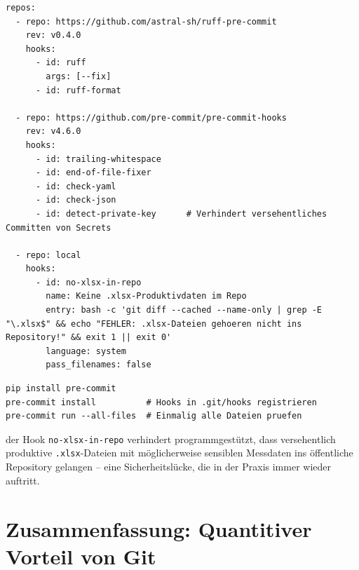 \documentclass[12pt,a4paper]{report}
\theoremstyle{definition}
\theoremstyle{remark}
\newcommand{\code}[1]{\texttt{#1}}
\begin{document}
\begin{lstlisting}[style=yaml, caption={.pre-commit-config.yaml -- Lokale Qualitaetssicherung}]
repos:
  - repo: https://github.com/astral-sh/ruff-pre-commit
    rev: v0.4.0
    hooks:
      - id: ruff
        args: [--fix]
      - id: ruff-format

  - repo: https://github.com/pre-commit/pre-commit-hooks
    rev: v4.6.0
    hooks:
      - id: trailing-whitespace
      - id: end-of-file-fixer
      - id: check-yaml
      - id: check-json
      - id: detect-private-key      # Verhindert versehentliches Committen von Secrets

  - repo: local
    hooks:
      - id: no-xlsx-in-repo
        name: Keine .xlsx-Produktivdaten im Repo
        entry: bash -c 'git diff --cached --name-only | grep -E "\.xlsx$" && echo "FEHLER: .xlsx-Dateien gehoeren nicht ins Repository!" && exit 1 || exit 0'
        language: system
        pass_filenames: false
\end{lstlisting}

\begin{lstlisting}[style=bash, caption={pre-commit installieren und aktivieren}]
pip install pre-commit
pre-commit install          # Hooks in .git/hooks registrieren
pre-commit run --all-files  # Einmalig alle Dateien pruefen
\end{lstlisting}

der Hook \code{no-xlsx-in-repo} verhindert programmgestützt, dass
versehentlich produktive \code{.xlsx}-Dateien mit möglicherweise
sensiblen Messdaten ins öffentliche Repository gelangen --
eine Sicherheitslücke, die in der Praxis immer wieder auftritt.

\section{Zusammenfassung: Quantitiver Vorteil von Git}
\end{document}
